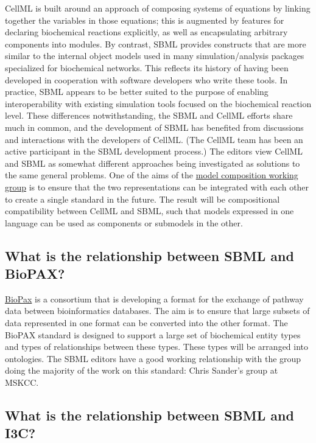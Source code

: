 \documentclass{sbmlfaq}
\begin{document}
CellML is built around an approach of composing systems of equations
by linking together the variables in those equations; this is augmented
by features for declaring biochemical reactions explicitly, as well as
encapsulating arbitrary components into modules.  By contrast, SBML
provides constructs that are
more similar to the internal object models used in many simulation/analysis
packages specialized for biochemical networks.  This reflects its history
of having been developed in cooperation with software developers who write
these tools.  In practice, SBML appears to be better suited to the purpose
of enabling interoperability with existing simulation tools focused on the
biochemical reaction level.  These differences notwithstanding, the SBML and
CellML efforts share much
in common, and the development of SBML has benefited from discussions and
interactions with the developers of CellML.  (The CellML
team has been an active participant in the SBML development process.)  The editors view CellML and
SBML as somewhat different approaches being investigated as solutions to the
same general problems.  One of the aims of the
\href{http://www.mpi-magdeburg.mpg.de/zlocal/martins/sbml-comp/}
{model composition working group}
is to ensure that the two representations can be integrated with each other to create
a single standard in the future.  The result will be compositional compatibility
between CellML and SBML, such that models expressed in one language can be
used as components or submodels in the other.

\subsection{What is the relationship between SBML and BioPAX?}

\href{http://www.biopax.org/}{BioPax} is a consortium that is developing a
format for the exchange of pathway data between bioinformatics databases.
The aim is to ensure that large subsets of data represented in one format
can be converted into the other format.  The BioPAX standard is designed to
support a large set of biochemical entity types and types of relationships
between these types.  These types will be arranged into ontologies.  The
SBML editors have a good working relationship with the group doing the
majority of the work on this standard: Chris Sander's group at MSKCC.

\subsection{What is the relationship between SBML and I3C?}
\end{document}
